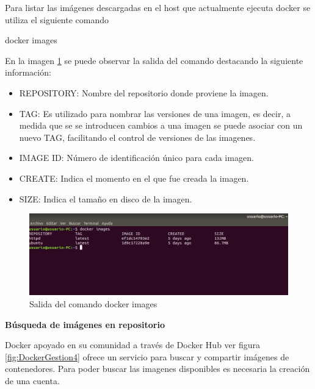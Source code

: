 Para listar las imágenes descargadas en el host que actualmente ejecuta docker se utiliza el siguiente comando  \begin{commandshell}docker images\end{commandshell}

En la imagen \ref{fig:DockerGestion2} se puede observar la salida del comando destacando la siguiente información:
\begin{itemize}
    \item REPOSITORY: Nombre del repositorio donde proviene la imagen.
    \item TAG: Es utilizado para nombrar las versiones de una imagen, es decir, a medida que se se introducen cambios a una imagen se puede asociar con un nuevo TAG, facilitando el control de versiones de las imagenes.
    \item IMAGE ID: Número de identificación único para cada imagen.
    \item CREATE: Indica el momento en el que fue creada la imagen.
    \item SIZE: Indica el tamaño en disco de la imagen.
\end{itemize}

\begin{figure}[!hbtp]
	\centering
	\includegraphics[width=\linewidth]{Trabajo/RecursosEducativos/RE05_Docker/Gestion_basica/REDocker_Gestion2.png}
	\vspace{-0.2cm}
	\caption{Salida del comando docker images}
	\label{fig:DockerGestion2}
\end{figure}
\textbf{Búsqueda de imágenes en repositorio}

Docker apoyado en su comunidad a través de Docker Hub ver figura \ref{fig:DockerGestion4} ofrece un servicio para buscar y compartir imágenes de contenedores. Para poder buscar las imagenes disponibles es necesaria la creación de una cuenta.

